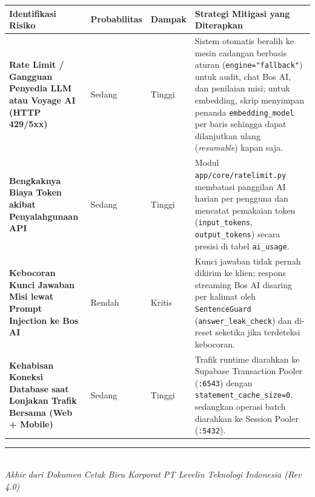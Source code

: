 \documentclass[11pt,a4paper]{report}
\begin{document}
\renewcommand{\arraystretch}{1.35}
\begin{tabularx}{\textwidth}{L{3.5cm} C{1.8cm} C{1.8cm} X}
\toprule
\textbf{Identifikasi Risiko} & \textbf{Probabilitas} & \textbf{Dampak} & \textbf{Strategi Mitigasi yang Diterapkan} \\
\midrule
\textbf{Rate Limit / Gangguan Penyedia LLM atau Voyage AI (HTTP 429/5xx)} & Sedang & Tinggi & Sistem otomatis beralih ke mesin cadangan berbasis aturan (\texttt{engine="fallback"}) untuk audit, chat Bos AI, dan penilaian misi; untuk embedding, skrip menyimpan penanda \texttt{embedding\_model} per baris sehingga dapat dilanjutkan ulang (\textit{resumable}) kapan saja. \\
\textbf{Bengkaknya Biaya Token akibat Penyalahgunaan API} & Sedang & Tinggi & Modul \texttt{app/core/ratelimit.py} membatasi panggilan AI harian per pengguna dan mencatat pemakaian token (\texttt{input\_tokens}, \texttt{output\_tokens}) secara presisi di tabel \texttt{ai\_usage}. \\
\textbf{Kebocoran Kunci Jawaban Misi lewat Prompt Injection ke Bos AI} & Rendah & Kritis & Kunci jawaban tidak pernah dikirim ke klien; respons streaming Bos AI disaring per kalimat oleh \texttt{SentenceGuard} (\texttt{answer\_leak\_check}) dan di-reset seketika jika terdeteksi kebocoran. \\
\textbf{Kehabisan Koneksi Database saat Lonjakan Trafik Bersama (Web + Mobile)} & Sedang & Tinggi & Trafik runtime diarahkan ke Supabase Transaction Pooler (\texttt{:6543}) dengan \texttt{statement\_cache\_size=0}, sedangkan operasi batch diarahkan ke Session Pooler (\texttt{:5432}). \\
\bottomrule
\end{tabularx}

\vspace{1cm}
\begin{center}
\rule{0.6\textwidth}{0.6pt}\\[0.2cm]
{\footnotesize\color{LevelinMuted}\textit{Akhir dari Dokumen Cetak Biru Korporat PT Levelin Teknologi Indonesia (Rev 4.0)}}
\end{center}
\end{document}
